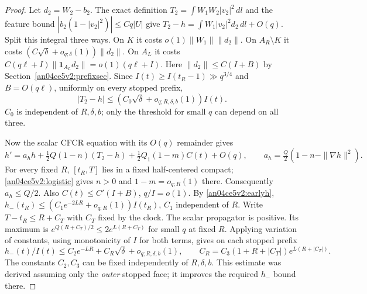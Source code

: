 \documentclass[11pt]{article}
\newcommand{\dd}{\,dl}
\begin{document}
\begin{proof}
Let $d_2=W_2-b_2$. The exact definition $T_2=\int W_1W_2|v_2|^2\dd$ and the feature bound $|b_2(1-|v_2|^2)|\le Cq|U|$ give $T_2-h=\int W_1|v_2|^2d_2\dd+O(q)$. Split this integral three ways. On $K$ it costs $o(1)\|W_1\|\|d_2\|$. On $A_R\setminus K$ it costs $(C\sqrt\delta+o_{q;\delta}(1))\|d_2\|$. On $A_L$ it costs $C(q\ell+I)\|\mathbf1_{A_L}d_2\|=o(1)(q\ell+I)$. Here $\|d_2\|\le C(I+B)$ by Section~\ref{an04ce5v2:prefixsec}. Since $I(t)\ge I(t_R-1)\gg q^{3/4}$ and $B=O(q\ell)$, uniformly on every stopped prefix,
\begin{equation}\label{an04ce5v2:t2}
 |T_2-h|\le(C_0\sqrt\delta+o_{q;R,\delta,b}(1))I(t).
\end{equation}
$C_0$ is independent of $R,\delta,b$; only the threshold for small $q$ can depend on all three.

Now the scalar CFCR equation with its $O(q)$ remainder gives
\[
 h'=a_h h+\tfrac12 Q(1-n)(T_2-h)+\tfrac12 Q_1(1-m)C(t)+O(q),
 \qquad a_h=\tfrac Q2(1-n-\|\nabla h\|^2).
\]
For every fixed $R$, $[t_R,T]$ lies in a fixed half-centered compact; \eqref{an04ce5v2:logistic} gives $n>0$ and $1-m=o_{q;R}(1)$ there. Consequently $a_h\le Q/2$. Also $C(t)\le C'(I+B)$, $q/I=o(1)$. By \eqref{an04ce5v2:earlyh},
$h_-(t_R)\le(C_1 e^{-2LR}+o_{q;R}(1))I(t_R)$, $C_1$ independent of $R$. Write $T-t_R\le R+C_T$ with $C_T$ fixed by the clock. The scalar propagator is positive. Its maximum is $e^{Q(R+C_T)/2}\le 2e^{L(R+C_T)}$ for small $q$ at fixed $R$. Applying variation of constants, using monotonicity of $I$ for both terms, gives on each stopped prefix
\[
 h_-(t)/I(t)\le C_2e^{-LR}+C_R\sqrt\delta+o_{q;R,\delta,b}(1),
 \qquad C_R=C_3(1+R+|C_T|)e^{L(R+|C_T|)}.
\]
The constants $C_2,C_3$ can be fixed independently of $R,\delta,b$. This estimate was derived assuming only the \emph{outer} stopped face; it improves the required $h_-$ bound there.


\end{proof}
\end{document}
